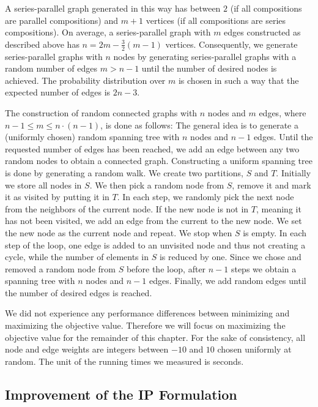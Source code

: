A series-parallel graph generated in this way has between $2$ (if all compositions are parallel compositions) and $m+1$ vertices (if all compositions are series compositions). On average, a series-parallel graph with $m$ edges constructed as described above has $n = 2m-\frac{3}{2}(m-1)$ vertices. Consequently, we generate series-parallel graphs with $n$ nodes by generating series-parallel graphs with a random number of edges $m > n - 1$ until the number of desired nodes is achieved. The probability distribution over $m$ is chosen in such a way that the expected number of edges is $2n - 3$.\medskip

The construction of random connected graphs with $n$ nodes and $m$ edges, where $n-1 \leq m \leq n \cdot (n - 1)$, is done as follows: The general idea is to generate a (uniformly chosen) random spanning tree with $n$ nodes and $n - 1$ edges. Until the requested number of edges has been reached, we add an edge between any two random nodes to obtain a connected graph. Constructing a uniform spanning tree is done by generating a random walk. We create two partitions, $S$ and $T$. Initially we store all nodes in $S$. We then pick a random node from $S$, remove it and mark it as visited by putting it in $T$. In each step, we randomly pick the next node from the neighbors of the current node. If the new node is not in $T$,  meaning it has not been visited, we add an edge from the current to the new node. We set the new node as the current node and repeat. We stop when $S$ is empty. In each step of the loop, one edge is added to an unvisited node and thus not creating a cycle, while the number of elements in $S$ is reduced by one. Since we chose and removed a random node from $S$ before the loop, after $n - 1$ steps we obtain a spanning tree with $n$ nodes and $n - 1$ edges. Finally, we add random edges until the number of desired edges is reached.\medskip

We did not experience any performance differences between minimizing and maximizing the objective value. Therefore we will focus on maximizing the objective value for the remainder of this chapter. For the sake of consistency, all node and edge weights are integers between $-10$ and $10$ chosen uniformly at random. The unit of the running times we measured is seconds.\medskip

\subsection{Improvement of the IP Formulation}
\label{sec:study:ips}

